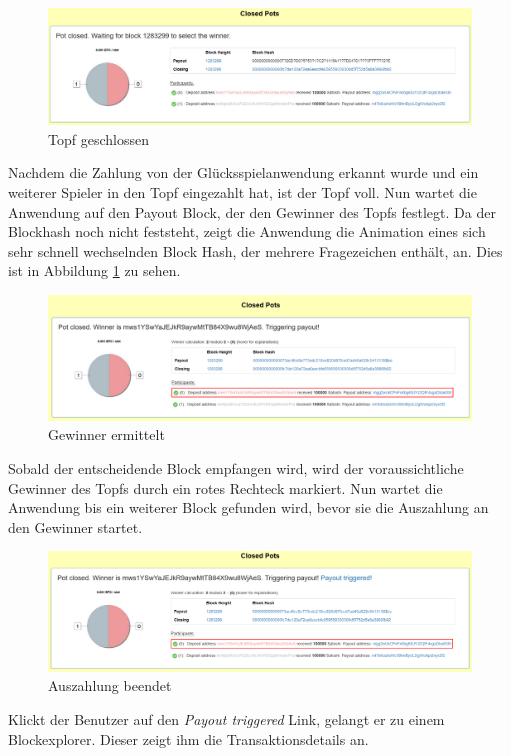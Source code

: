 \begin{figure}[H]
\centering
\includegraphics[width=1\linewidth]{Figures/btc_gui/pot_closed}
\decoRule
\caption{Topf geschlossen}
\label{fig:pot_closed}
\end{figure}
Nachdem die Zahlung von der Glücksspielanwendung erkannt wurde und ein weiterer Spieler in den Topf eingezahlt hat, ist der Topf voll. Nun wartet die Anwendung auf den Payout Block, der den Gewinner des Topfs festlegt. Da der Blockhash noch nicht feststeht, zeigt die Anwendung die Animation eines sich sehr schnell wechselnden Block Hash, der mehrere Fragezeichen enthält, an. Dies ist in Abbildung \ref{fig:pot_closed} zu sehen.

\begin{figure}[H]
\centering
\includegraphics[width=1\linewidth]{Figures/btc_gui/pot_settled}
\decoRule
\caption{Gewinner ermittelt}
\label{fig:pot_settled}
\end{figure}
Sobald der entscheidende Block empfangen wird, wird der voraussichtliche Gewinner des Topfs durch ein rotes Rechteck markiert. Nun wartet die Anwendung bis ein weiterer Block gefunden wird, bevor sie die Auszahlung an den Gewinner startet. 

\begin{figure}[H]
\centering
\includegraphics[width=1\linewidth]{Figures/btc_gui/pot_payout_finished}
\decoRule
\caption{Auszahlung beendet}
\label{fig:pot_settled}
\end{figure}

Klickt der Benutzer auf den \emph{Payout triggered} Link, gelangt er zu einem Blockexplorer. Dieser zeigt ihm die Transaktionsdetails an. 